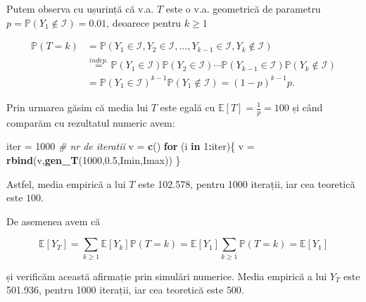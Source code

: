 \documentclass[]{article}
\newenvironment{Shaded}{\begin{snugshade}}{\end{snugshade}}
\newcommand{\CommentTok}[1]{\textcolor[rgb]{0.56,0.35,0.01}{\textit{#1}}}
\newcommand{\ControlFlowTok}[1]{\textcolor[rgb]{0.13,0.29,0.53}{\textbf{#1}}}
\newcommand{\DecValTok}[1]{\textcolor[rgb]{0.00,0.00,0.81}{#1}}
\newcommand{\FloatTok}[1]{\textcolor[rgb]{0.00,0.00,0.81}{#1}}
\newcommand{\KeywordTok}[1]{\textcolor[rgb]{0.13,0.29,0.53}{\textbf{#1}}}
\newcommand{\NormalTok}[1]{#1}
\newcommand{\OperatorTok}[1]{\textcolor[rgb]{0.81,0.36,0.00}{\textbf{#1}}}
\newcommand{\StringTok}[1]{\textcolor[rgb]{0.31,0.60,0.02}{#1}}
\begin{document}
Putem observa cu ușurință că v.a. \(T\) este o v.a. geometrică de
parametru \(p=\mathbb{P}(Y_1\not\in\mathcal{I})=0.01\), deoarece pentru
\(k\geq1\)

\[
\begin{aligned}
  \mathbb{P}(T=k) &= \mathbb{P}(Y_1\in\mathcal{I},Y_2\in\mathcal{I},\dots,Y_{k-1}\in\mathcal{I},Y_k\not\in\mathcal{I})\\
                  &\overset{indep.}{=} \mathbb{P}(Y_1\in\mathcal{I})\mathbb{P}(Y_2\in\mathcal{I})\cdots\mathbb{P}(Y_{k-1}\in\mathcal{I})\mathbb{P}(Y_k\not\in\mathcal{I})\\
                  &= \mathbb{P}(Y_1\in\mathcal{I})^{k-1}\mathbb{P}(Y_1\not\in\mathcal{I}) = (1-p)^{k-1}p.
\end{aligned}
\]

Prin urmarea găsim că media lui \(T\) este egală cu
\(\mathbb{E}[T]=\frac{1}{p}=100\) și când comparăm cu rezultatul numeric
avem:

\begin{Shaded}
\begin{Highlighting}[]
\NormalTok{iter =}\StringTok{ }\DecValTok{1000} \CommentTok{# nr de iteratii}
\NormalTok{v =}\StringTok{ }\KeywordTok{c}\NormalTok{()}
\ControlFlowTok{for}\NormalTok{ (i }\ControlFlowTok{in} \DecValTok{1}\OperatorTok{:}\NormalTok{iter)\{}
\NormalTok{  v =}\StringTok{ }\KeywordTok{rbind}\NormalTok{(v,}\KeywordTok{gen_T}\NormalTok{(}\DecValTok{1000}\NormalTok{,}\FloatTok{0.5}\NormalTok{,Imin,Imax))}
\NormalTok{\}}
\end{Highlighting}
\end{Shaded}

Astfel, media empirică a lui \(T\) este 102.578, pentru 1000 iterații,
iar cea teoretică este \(100\).

De asemenea avem că

\[
\mathbb{E}[Y_T] = \sum_{k\geq1}\mathbb{E}[Y_k]\mathbb{P}(T=k) = \mathbb{E}[Y_1]\sum_{k\geq1}\mathbb{P}(T=k) = \mathbb{E}[Y_1]
\]

și verificăm această afirmație prin simulări numerice. Media empirică a
lui \(Y_T\) este 501.936, pentru 1000 iterații, iar cea teoretică este
\(500\).
\end{document}
